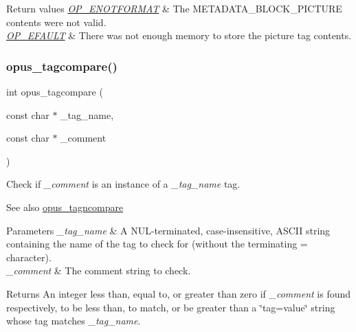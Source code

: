 \begin{DoxyRetVals}{Return values}
{\em \mbox{\hyperlink{group__error__codes_gafca3ae244d24e10b2851c77379453220}{O\+P\+\_\+\+E\+N\+O\+T\+F\+O\+R\+M\+AT}}} & The M\+E\+T\+A\+D\+A\+T\+A\+\_\+\+B\+L\+O\+C\+K\+\_\+\+P\+I\+C\+T\+U\+RE contents were not valid. \\
\hline
{\em \mbox{\hyperlink{group__error__codes_ga2ddb887c0bb55c74ea6be391fabcba59}{O\+P\+\_\+\+E\+F\+A\+U\+LT}}} & There was not enough memory to store the picture tag contents. \\
\hline
\end{DoxyRetVals}
\mbox{\label{group__header__info_gaad7582aee9be320d26b13f77e7b54106}} 
\subsubsection{\texorpdfstring{opus\_tagcompare()}{opus\_tagcompare()}}
{\footnotesize\ttfamily int opus\+\_\+tagcompare (\begin{DoxyParamCaption}\item[{const char $\ast$}]{\+\_\+tag\+\_\+name,  }\item[{const char $\ast$}]{\+\_\+comment }\end{DoxyParamCaption})}

Check if {\itshape \+\_\+comment} is an instance of a {\itshape \+\_\+tag\+\_\+name} tag. \begin{DoxySeeAlso}{See also}
\mbox{\hyperlink{group__header__info_gabf02fa65e49fde045ef787e42ef7b8c0}{opus\+\_\+tagncompare}} 
\end{DoxySeeAlso}

\begin{DoxyParams}{Parameters}
{\em \+\_\+tag\+\_\+name} & A N\+U\+L-\/terminated, case-\/insensitive, A\+S\+C\+II string containing the name of the tag to check for (without the terminating \textquotesingle{}=\textquotesingle{} character). \\
\hline
{\em \+\_\+comment} & The comment string to check. \\
\hline
\end{DoxyParams}
\begin{DoxyReturn}{Returns}
An integer less than, equal to, or greater than zero if {\itshape \+\_\+comment} is found respectively, to be less than, to match, or be greater than a \char`\"{}tag=value\char`\"{} string whose tag matches {\itshape \+\_\+tag\+\_\+name}. 
\end{DoxyReturn}
\mbox{\label{group__header__info_gabf02fa65e49fde045ef787e42ef7b8c0}} 
